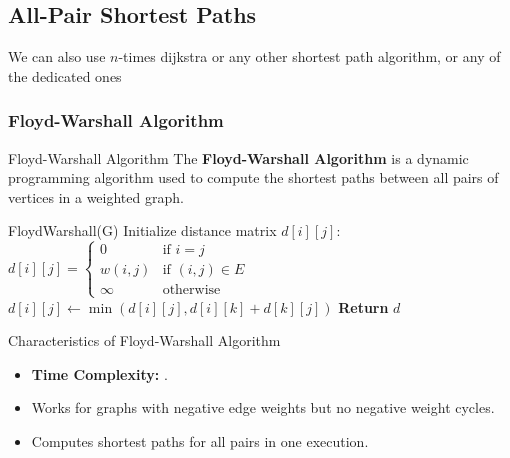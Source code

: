\newpage
\subsection{All-Pair Shortest Paths}
We can also use $n$-times dijkstra or any other shortest path algorithm, or any of the dedicated ones

\subsubsection{Floyd-Warshall Algorithm}
\begin{definition}[]{Floyd-Warshall Algorithm}
    The \textbf{Floyd-Warshall Algorithm} is a dynamic programming algorithm used to compute the shortest paths between all pairs of vertices in a weighted graph.
\end{definition}


\begin{algo}{FloydWarshall(G)}
        \State Initialize distance matrix $d[i][j]$: $d[i][j] =
            \begin{cases}
                0       & \text{if } i = j        \\
                w(i, j) & \text{if } (i, j) \in E \\
                \infty  & \text{otherwise}
            \end{cases}$
                \State $d[i][j] \gets \min(d[i][j], d[i][k] + d[k][j])$
            \EndFor
        \EndFor
        \State \textbf{Return} $d$
    \EndProcedure
\end{algo}

\begin{properties}[]{Characteristics of Floyd-Warshall Algorithm}
    \begin{itemize}
        \item \textbf{Time Complexity:} .
        \item Works for graphs with negative edge weights but no negative weight cycles.
        \item Computes shortest paths for all pairs in one execution.
    \end{itemize}
\end{properties}

